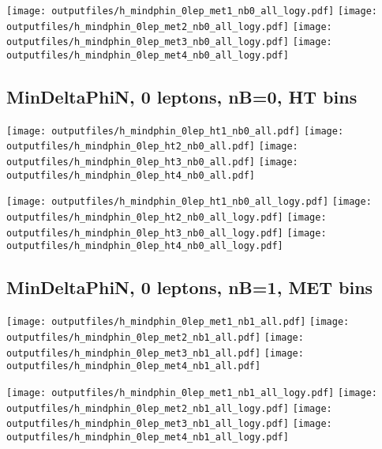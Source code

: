 \documentclass[11pt]{article}
\begin{document}
    \noindent
     \texttt{[image: outputfiles/h\_mindphin\_0lep\_met1\_nb0\_all\_logy.pdf]}
     \texttt{[image: outputfiles/h\_mindphin\_0lep\_met2\_nb0\_all\_logy.pdf]}
     \texttt{[image: outputfiles/h\_mindphin\_0lep\_met3\_nb0\_all\_logy.pdf]}
     \texttt{[image: outputfiles/h\_mindphin\_0lep\_met4\_nb0\_all\_logy.pdf]}

    \clearpage



    \subsection{ MinDeltaPhiN, 0 leptons, nB=0, HT bins }

    \noindent
     \texttt{[image: outputfiles/h\_mindphin\_0lep\_ht1\_nb0\_all.pdf]}
     \texttt{[image: outputfiles/h\_mindphin\_0lep\_ht2\_nb0\_all.pdf]}
     \texttt{[image: outputfiles/h\_mindphin\_0lep\_ht3\_nb0\_all.pdf]}
     \texttt{[image: outputfiles/h\_mindphin\_0lep\_ht4\_nb0\_all.pdf]}

    \noindent
     \texttt{[image: outputfiles/h\_mindphin\_0lep\_ht1\_nb0\_all\_logy.pdf]}
     \texttt{[image: outputfiles/h\_mindphin\_0lep\_ht2\_nb0\_all\_logy.pdf]}
     \texttt{[image: outputfiles/h\_mindphin\_0lep\_ht3\_nb0\_all\_logy.pdf]}
     \texttt{[image: outputfiles/h\_mindphin\_0lep\_ht4\_nb0\_all\_logy.pdf]}

    \clearpage


    \subsection{ MinDeltaPhiN, 0 leptons, nB=1, MET bins }

    \noindent
     \texttt{[image: outputfiles/h\_mindphin\_0lep\_met1\_nb1\_all.pdf]}
     \texttt{[image: outputfiles/h\_mindphin\_0lep\_met2\_nb1\_all.pdf]}
     \texttt{[image: outputfiles/h\_mindphin\_0lep\_met3\_nb1\_all.pdf]}
     \texttt{[image: outputfiles/h\_mindphin\_0lep\_met4\_nb1\_all.pdf]}

    \noindent
     \texttt{[image: outputfiles/h\_mindphin\_0lep\_met1\_nb1\_all\_logy.pdf]}
     \texttt{[image: outputfiles/h\_mindphin\_0lep\_met2\_nb1\_all\_logy.pdf]}
     \texttt{[image: outputfiles/h\_mindphin\_0lep\_met3\_nb1\_all\_logy.pdf]}
     \texttt{[image: outputfiles/h\_mindphin\_0lep\_met4\_nb1\_all\_logy.pdf]}
\end{document}
